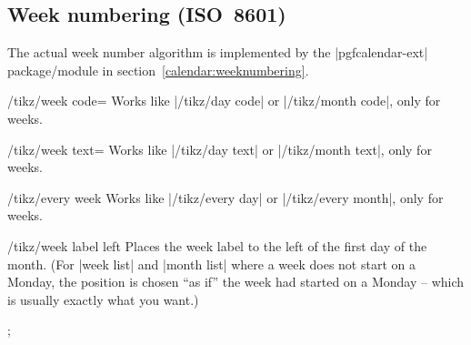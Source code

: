 \begin{multicols}{2}
\subsection{Week numbering (ISO~8601)}

The actual week number algorithm is implemented by the |pgfcalendar-ext| package/module in section~\ref{calendar:weeknumbering}.
\begin{key}{/tikz/week code=}
  Works like |/tikz/day code| or |/tikz/month code|, only for weeks.
\end{key}

\begin{key}{/tikz/week text=}
  Works like |/tikz/day text| or |/tikz/month text|, only for weeks.
\end{key}

\begin{stylekey}{/tikz/every week}
  Works like |/tikz/every day| or |/tikz/every month|, only for weeks.
\end{stylekey}

\begin{stylekey}{/tikz/week label left}
    Places the week label to the left of the first day of the month. (For
    |week list| and |month list| where a week does not start on a Monday, the
    position is chosen ``as if'' the week had started on a Monday --  which is
    usually exactly what you want.)
\begin{codeexample}[preamble={\usetikzlibrary{ext.calendar-plus}}]
\tikz
  \calendar[
    week list, month label above centered,
    dates=2022-07-01 to 2022-07-31,
    week label left,
    every week/.append style={
      gray!50!black, font=\sffamily}];
\end{codeexample}
\end{stylekey}

\end{multicols}
\endinput